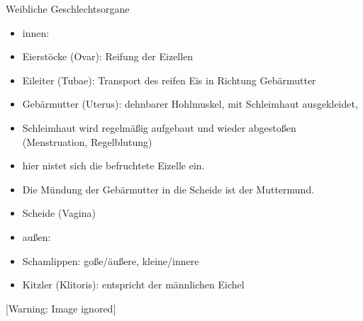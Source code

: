 \documentclass{article}
\begin{document}
Weibliche Geschlechtsorgane

\begin{itemize}
\item innen:

\end{itemize}
\begin{itemize}
\item Eierst\"ocke (Ovar): Reifung der Eizellen

\item Eileiter (Tubae): Transport des reifen Eis in Richtung
Geb\"armutter

\item Geb\"armutter (Uterus): dehnbarer Hohlmuskel, mit
Schleimhaut ausgekleidet, 

\end{itemize}
\begin{itemize}
\item Schleimhaut wird regelm\"a{\ss}ig aufgebaut und wieder
abgesto{\ss}en (Menstruation, Regelblutung)

\item hier nistet sich die befruchtete Eizelle ein. 

\item Die M\"undung der Geb\"armutter in die Scheide ist der Muttermund.


\end{itemize}
\begin{itemize}
\item Scheide (Vagina)

\end{itemize}
\begin{itemize}
\item au{\ss}en: 

\end{itemize}
\begin{itemize}
\item Schamlippen: go{\ss}e/\"au{\ss}ere, kleine/innere

\item Kitzler (Klitoris): entspricht der m\"annlichen Eichel

\end{itemize}
  [Warning: Image ignored] %
 
\end{document}
